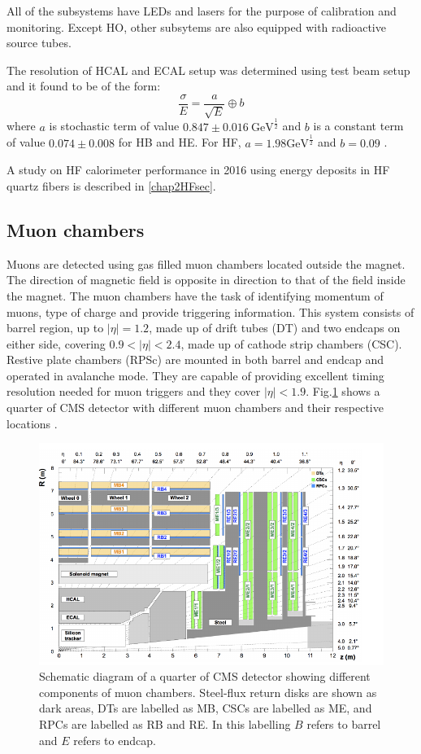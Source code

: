 All of the subsystems have LEDs and lasers for the purpose of calibration and monitoring. Except HO, other subsytems are also equipped with radioactive source tubes.

The resolution of HCAL and ECAL setup was determined using test beam setup and it found to be of the form:
\begin{equation}
\frac{\sigma}{E} = \frac{a}{\sqrt{E}} \oplus b
\end{equation}
where $a$ is stochastic term of value $0.847\pm 0.016\ {\mathrm{GeV}}^{\frac{1}{2}}$ and $b$ is a constant term of value $0.074\pm0.008$ for HB and HE. For HF, $a = 1.98 {\mathrm{GeV}}^{\frac{1}{2}}$ and $b = 0.09$ \cite{Collaboration_2010}.

A study on HF calorimeter performance in 2016 using energy deposits in HF quartz fibers is described in \ref{chap2HFsec}.

\subsection{Muon chambers}
Muons are detected using gas filled muon chambers located outside the magnet. The direction of magnetic field is opposite in direction to that of the field inside the magnet. The muon chambers have the task of identifying momentum of muons, type of charge and provide triggering information. This system consists of barrel region, up to $|\eta| = 1.2$, made up of drift tubes (DT) and two endcaps on either side, covering $0.9 < |\eta| < 2.4$, made up of cathode strip chambers (CSC). Restive plate chambers (RPSc) are mounted in both barrel and endcap and operated in avalanche mode. They are capable of providing excellent timing resolution needed for muon triggers and they cover $|\eta| < 1.9$. Fig.\ref{fig:Muon_chambers} shows a quarter of CMS detector with different muon chambers and their respective locations \cite{Sirunyan:2018fpa}.
\begin{figure}[h!]
\centering
\includegraphics[width=0.95\linewidth]{../Figures/Chap2/Muon_chambers}
\captionsetup{width=.95\linewidth}
\caption[Muon chambers]{Schematic diagram of a quarter of CMS detector showing different components of muon chambers. Steel-flux return disks are shown as dark areas, DTs are labelled as MB, CSCs are labelled as ME, and RPCs are labelled as RB and RE. In this labelling $B$ refers to barrel and $E$ refers to endcap.}
\label{fig:Muon_chambers}
\end{figure}

